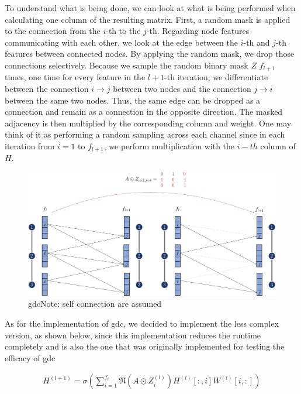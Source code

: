 To understand what is being done, we can look at what is being performed when calculating one column of the resulting matrix. First, a random mask is applied to the connection from the $i$-th to the $j$-th. Regarding node features communicating with each other, we look at the edge between the $i$-th and $j$-th features between connected nodes. By applying the random mask, we drop those connections selectively. Because we sample the random binary mask $Z$ $f_{l+1}$ times, one time for every feature in the $l+1$-th iteration, we differentiate between the connection $i \rightarrow j$ between two nodes and the connection $j \rightarrow i$ between the same two nodes. Thus, the same edge can be dropped as a connection and remain as a connection in the opposite direction. The masked adjacency is then multiplied by the corresponding column and weight.
One may think of it as performing a random sampling across each channel since in each iteration from $i=1$ to $f_{l+1}$, we perform multiplication with the $i-th$ column of $H$.

\begin{figure}[ht]
    \centering
    \includegraphics[width= 0.90\linewidth]{gfx/implementation/GDC-eq4.pdf}
    \caption{\Ac{gdc}Note: self connection are assumed}\label{fig:implementaion:GDC-eq4}
\end{figure}


As for the implementation of \ac{gdc}, we decided to implement the less complex version, as shown below, since this implementation reduces the runtime completely and is also the one that was originally implemented for testing the efficacy of \ac{gdc}

\begin{align}
    H^{(l+1)} = \sigma(\sum_{i= 1}^{f_{l}}\mathfrak{N}(A \odot Z_{i}^{(l)})H^{(l)}[:,i] W^{(l)}[i,:]) \label{eq:relaxed}
\end{align}



